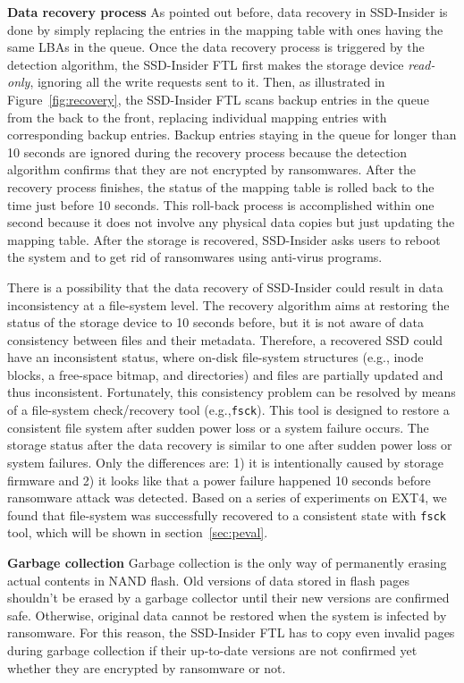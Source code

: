 \documentclass[conference]{IEEEtran}
\newcommand{\eg}{e.g.,\xspace}
\newcommand{\ours}{SSD-Insider}
\begin{document}
{\noindent\bf Data recovery process} 
As pointed out before, data recovery in \ours{} is done by
simply replacing the entries in the mapping table with ones having the same LBAs
in the queue.  Once the data recovery process is
triggered by the detection algorithm, the \ours{} FTL first makes the
storage device \textit{read-only}, ignoring all the write requests
sent to it.  Then, as illustrated in Figure~\ref{fig:recovery}, the
\ours{} FTL scans backup entries in the queue from the back to
the front, replacing individual mapping entries with corresponding
backup entries.  Backup entries staying in the queue for longer
than 10 seconds are ignored during the recovery process because the
detection algorithm confirms that they are not encrypted by
ransomwares.  After the recovery process finishes, the status of
the mapping table is rolled back to the time just before 10
seconds.  This roll-back process is accomplished within one second
because it does not involve any physical data copies but just updating the mapping table. 
After the storage is recovered, \ours{} asks users to reboot the system
and to get rid of ransomwares using anti-virus programs.

There is a possibility that the data recovery of \ours{} could
result in data inconsistency at a file-system level.  The recovery
algorithm aims at restoring the status of the storage device to 10
seconds before, but it is not aware of data consistency between files
and their metadata.  Therefore, a recovered SSD could have an
inconsistent status, where on-disk file-system structures (\eg
inode blocks, a free-space bitmap, and directories) and files are
partially updated and thus inconsistent.  Fortunately, this
consistency problem can be resolved by means of a file-system
check/recovery tool (\eg \texttt{fsck}).  This tool is designed
to restore a consistent file system after sudden power loss or a
system failure occurs.  The storage status after the data recovery
is similar to one after sudden power loss or system failures. Only
the differences are: 1) it is intentionally caused by storage
firmware and 2) it looks like that a power failure happened 10
seconds before ransomware attack was detected.  Based on a series
of experiments on EXT4, we found that file-system was successfully
recovered to a consistent state with \texttt{fsck} tool, 
which will be shown in section~\ref{sec:peval}.

{\noindent\bf Garbage collection} 
Garbage collection is the only way of permanently erasing actual
contents in NAND flash. Old versions of data stored in
flash pages shouldn't be erased by a garbage collector until their
new versions are confirmed safe. Otherwise, original data cannot be
restored when the system is infected by ransomware.  For this
reason, the \ours{} FTL has to copy even invalid pages during
garbage collection if their up-to-date versions are not confirmed
yet whether they are encrypted by ransomware or not. 
\end{document}
